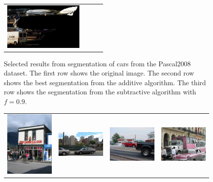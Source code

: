\documentclass[10pt,twocolumn,letterpaper]{article}
\begin{document}
\begin{figure}[p]
\begin{tabular}{ p{4cm} p{4cm} p{4cm} p{4cm} }
\includegraphics[width=3.95cm]{figures/add_res/car/2008_000251.jpg_1_good.jpg.eps} \\
\end{tabular}
\caption{Selected results from segmentation of cars from the Pascal2008
dataset.  The first row shows the original image.  The second row shows
the best segmentation from the additive algorithm.  The third row shows
the segmentation from the subtractive algorithm with $f=0.9$.}
\label{fig:good_results_car}
\end{figure}


\begin{figure}[p]
\centering
\begin{tabular}{ p{4cm} p{4cm} p{4cm} p{4cm} }
\includegraphics[width=3.95cm]{figures/add_res/car/2008_000868.jpg.eps} &
\includegraphics[width=3.95cm]{figures/add_res/car/2008_000884.jpg.eps} &
\includegraphics[width=3.95cm]{figures/add_res/car/2008_001830.jpg.eps} &
\includegraphics[width=3.95cm]{figures/add_res/car/2008_001867.jpg.eps} \\

\end{tabular}
\end{figure}
\end{document}
